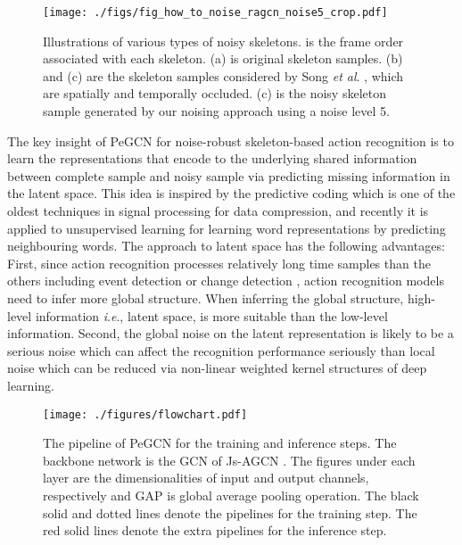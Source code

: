 \documentclass[runningheads]{llncs}
\newcommand{\etal}{\textit{et al}. }
\newcommand{\ie}{\textit{i}.\textit{e}., }
\begin{document}
\begin{figure*}[t]
\centering
\texttt{[image: ./figs/fig\_how\_to\_noise\_ragcn\_noise5\_crop.pdf]}
\caption{Illustrations of various types of noisy skeletons.  is the frame order associated with each skeleton.
 (a) is original skeleton samples. (b) and (c) are the skeleton samples considered by Song \etal \cite{song2019richly}, which are spatially and temporally occluded. (c) is the noisy skeleton sample generated by our noising approach using a noise level 5.}
\label{fig:noise_typ}
\vspace{-4ex}
\end{figure*}

The key insight of PeGCN for noise-robust skeleton-based action recognition is to learn the representations that encode to the underlying shared information between complete sample and noisy sample via predicting missing information in the latent space. This idea is inspired by the predictive coding \cite{1055126,atal1970adaptive,oord2018representation} which is one of the oldest techniques in signal processing for data compression, and recently it is applied to unsupervised learning for learning word representations \cite{mikolov2013efficient} by predicting neighbouring words. The approach to latent space has the following advantages: First, since action recognition processes relatively long time samples than the others including event detection \cite{yu2018joint,8580568} or change detection \cite{hussain2013change}, action recognition models need to infer more global structure. When inferring the global structure, high-level information \ie latent space, is more suitable than the low-level information. Second, the global noise on the latent representation is likely to be a serious noise which can affect the recognition performance seriously than local noise which can be reduced via non-linear weighted kernel structures of deep learning.

\begin{figure*}[t]
	\vspace{-0.2cm}
	\begin{center}
		\centerline{\texttt{[image: ./figures/flowchart.pdf]}}
		\caption{The pipeline of PeGCN for the training and inference steps. The backbone network is the GCN of Js-AGCN \cite{shi2019two}. The figures under each layer are the dimensionalities of input and output channels, respectively and GAP is global average pooling operation. The black solid and dotted lines denote the pipelines for the training step. The red solid lines denote the extra pipelines for the inference step.}
		\label{fig:1}
	\end{center}
	\vspace{-8ex}
\end{figure*}
\end{document}
